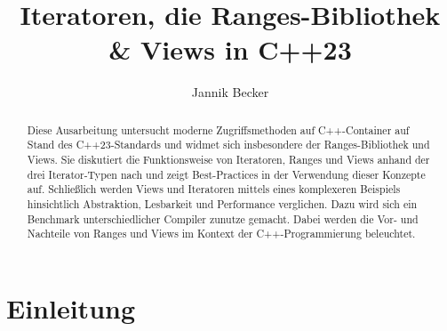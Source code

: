 \documentclass[runningheads]{llncs}
\begin{document}
\title{Iteratoren, die Ranges-Bibliothek \& Views in C++23}
\author{Jannik Becker}
\institute{}
\maketitle
\vspace{-.5cm}
\begin{abstract}


	Diese Ausarbeitung untersucht moderne Zugriffsmethoden auf C++-Container auf Stand des C++23-Standards und widmet sich insbesondere der Ranges-Bibliothek und Views.
	Sie diskutiert die Funktionsweise von Iteratoren, Ranges und Views anhand der drei Iterator-Typen nach \cite{plp} und zeigt Best-Practices in der Verwendung dieser Konzepte auf.
	Schließlich werden Views und Iteratoren mittels eines komplexeren Beispiels hinsichtlich Abstraktion, Lesbarkeit und Performance verglichen.
	Dazu wird sich ein Benchmark unterschiedlicher Compiler zunutze gemacht.
	Dabei werden die Vor- und Nachteile von Ranges und Views im Kontext der C++-Programmierung beleuchtet.
\end{abstract}

\section{Einleitung}
\end{document}
